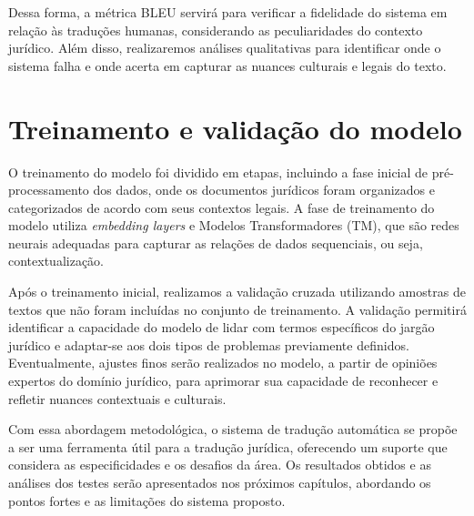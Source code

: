 Dessa forma, a métrica BLEU servirá para verificar a fidelidade do sistema em relação às traduções humanas, considerando as peculiaridades do contexto jurídico. Além disso, realizaremos análises qualitativas para identificar onde o sistema falha e onde acerta em capturar as nuances culturais e legais do texto.

\section{Treinamento e validação do modelo}

O treinamento do modelo foi dividido em etapas, incluindo a fase inicial de pré-processamento dos dados, onde os documentos jurídicos foram organizados e categorizados de acordo com seus contextos legais. A fase de treinamento do modelo utiliza \textit{embedding layers} e Modelos Transformadores (TM), que são redes neurais adequadas para capturar as relações de dados sequenciais, ou seja, contextualização.

Após o treinamento inicial, realizamos a validação cruzada utilizando amostras de textos que não foram incluídas no conjunto de treinamento. A validação permitirá identificar a capacidade do modelo de lidar com termos específicos do jargão jurídico e adaptar-se aos dois tipos de problemas previamente definidos. Eventualmente, ajustes finos serão realizados no modelo, a partir de opiniões expertos do domínio jurídico, para aprimorar sua capacidade de reconhecer e refletir nuances contextuais e culturais.

Com essa abordagem metodológica, o sistema de tradução automática se propõe a ser uma ferramenta útil para a tradução jurídica, oferecendo um suporte que considera as especificidades e os desafios da área. Os resultados obtidos e as análises dos testes serão apresentados nos próximos capítulos, abordando os pontos fortes e as limitações do sistema proposto.






